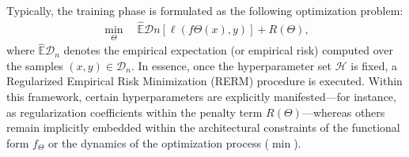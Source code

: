 Typically, the training phase is formulated as the following optimization problem:%
\begin{align}\label{ch2:eq:generalproblem}\min_\Theta \quad \hat{\mathbb{E}}{\mathcal{D}n} \left[ \ell(f\Theta(x), y) \right] + R(\Theta),
\end{align}
%
where $\hat{\mathbb{E}}{\mathcal{D}_n}$ denotes the empirical expectation (or empirical risk) computed over the samples $(x, y) \in \mathcal{D}_n$.
In essence, once the hyperparameter set $\mathcal{H}$ is fixed, a Regularized Empirical Risk Minimization (RERM) procedure is executed. 
Within this framework, certain hyperparameters are explicitly manifested—for instance, as regularization coefficients within the penalty term $R(\Theta)$—whereas others remain implicitly embedded within the architectural constraints of the functional form $f_\Theta$ or the dynamics of the optimization process ($\min$).

